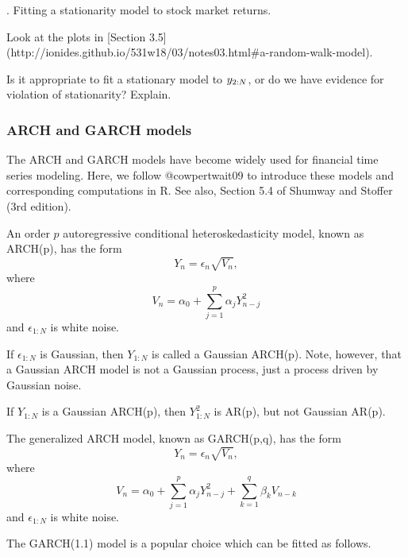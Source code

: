 \documentclass{beamer}
\newcommand\answer[2]{#1} %
\begin{document}
\begin{frame}[fragile]


\myquestion. Fitting a stationarity model to stock market returns.

\bi

\item Look at the plots in  [Section 3.5](http://ionides.github.io/531w18/03/notes03.html#a-random-walk-model). 

\item Is it appropriate to fit a stationary model to $y_{2:N}$, or do we have evidence for violation of stationarity? Explain.

\ei

\answer{\vspace{30mm}}{todo}

\end{frame}

\begin{frame}[fragile]

\frametitle{ARCH and GARCH models}

\bi

\item The ARCH and GARCH models have become widely used for financial time series modeling. Here, we follow @cowpertwait09 to introduce these models and corresponding computations in R. See also, Section 5.4 of Shumway and Stoffer (3rd edition). 

\item An order $p$ autoregressive conditional heteroskedasticity model, known as ARCH(p), has the form
$$ Y_n = \epsilon_n \sqrt{V_n},$$
where
$$ V_n = \alpha_0 + \sum_{j=1}^p \alpha_j Y_{n-j}^2$$
and $\epsilon_{1:N}$ is white noise.

\item If $\epsilon_{1:N}$ is Gaussian, then $Y_{1:N}$ is called a Gaussian ARCH(p). Note, however, that a Gaussian ARCH model is not a Gaussian process, just a process driven by Gaussian noise.

\item If  $Y_{1:N}$ is a Gaussian ARCH(p), then  $Y_{1:N}^2$ is AR(p), but not Gaussian AR(p).

\item The generalized ARCH model, known as GARCH(p,q), has the form
$$ Y_n = \epsilon_n \sqrt{V_n},$$
where
$$ V_n = \alpha_0 + \sum_{j=1}^p \alpha_j Y_{n-j}^2 + \sum_{k=1}^q \beta_k V_{n-k}$$
and $\epsilon_{1:N}$ is white noise.


\item The GARCH(1.1) model is a popular choice \citep{cowpertwait09} which can be fitted as follows.

\ei

\end{frame}
\end{document}
